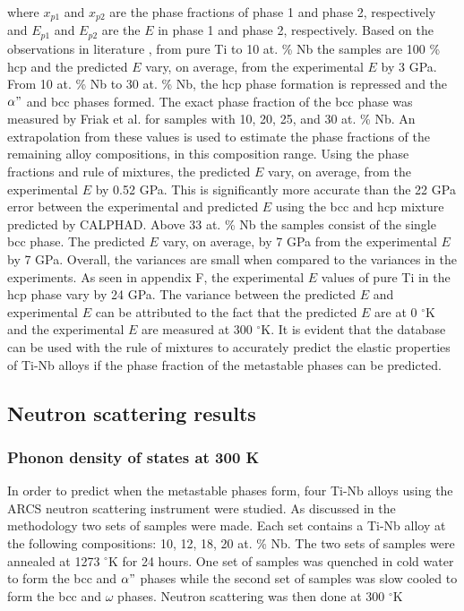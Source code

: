 \noindent where $x_{p1}$ and $x_{p2}$ are the phase fractions of phase 1 and phase 2, respectively and $E_{p1}$ and $E_{p2}$ are the $E$ in phase 1 and phase 2, respectively. Based on the observations in literature \cite{Friak2012,Timoshevskii2011,Friak2012,Karre2015}, from pure Ti to 10 at. \% Nb the samples are 100 \% hcp and the predicted $E$ vary, on average, from the experimental $E$ by 3 GPa. From 10 at. \% Nb to 30 at. \% Nb, the hcp phase formation is repressed and the $\alpha"$ and bcc phases formed. The exact phase fraction of the bcc phase was measured by Friak et al. \cite{Friak2012} for samples with 10, 20, 25, and 30 at. \% Nb. An extrapolation from these values is used to estimate the phase fractions of the remaining alloy compositions, in this composition range. Using the phase fractions and rule of mixtures, the predicted $E$ vary, on average, from the experimental $E$ by 0.52 GPa. This is significantly more accurate than the 22 GPa error between the experimental and predicted $E$ using the bcc and hcp mixture predicted by CALPHAD. Above 33 at. \% Nb the samples consist of the single bcc phase. The predicted $E$ vary, on average, by 7 GPa from the experimental $E$ by 7 GPa. Overall, the variances are small when compared to the variances in the experiments. As seen in appendix F, the experimental $E$ values of pure Ti in the hcp phase vary by 24 GPa. The variance between the predicted $E$ and experimental $E$ can be attributed to the fact that the predicted $E$ are at 0 $^\circ$K and the experimental $E$ are measured at 300 $^\circ$K. It is evident that the database can be used with the rule of mixtures to accurately predict the elastic properties of Ti-Nb alloys if the phase fraction of the metastable phases can be predicted.

\subsection{Neutron scattering results}

\subsubsection{Phonon density of states at 300 K}

In order to predict when the metastable phases form, four Ti-Nb alloys using the ARCS neutron scattering instrument were studied. As discussed in the methodology two sets of samples were made. Each set contains a Ti-Nb alloy at the following compositions: 10, 12, 18, 20 at. \% Nb. The two sets of samples were annealed at 1273 $^\circ$K for 24 hours. One set of samples was quenched in cold water to form the bcc and $\alpha"$ phases while the second set of samples was slow cooled to form the bcc and $\omega$ phases. Neutron scattering was then done at 300 $^\circ$K

